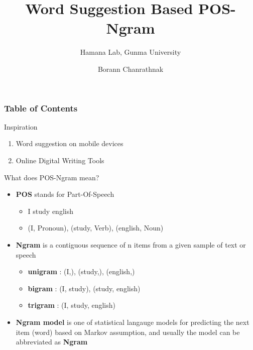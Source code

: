 \documentclass{beamer}
\title{Word Suggestion Based POS-Ngram}
\subtitle{Hamana Lab, Gunma University}
\author{Borann Chanrathnak}
\begin{document}
\maketitle


\begin{frame}
\frametitle{Table of Contents}
\tableofcontents
\end{frame}

\begin{frame}{Inspiration}
\begin{enumerate}
    \item Word suggestion on mobile devices
    \item Online Digital Writing Tools
\end{enumerate}

\end{frame}


\begin{frame}{What does POS-Ngram mean?}
\begin{itemize}
    \item \textbf{POS} stands for Part-Of-Speech
        \begin{itemize}
            \item I study english
            \item (I, Pronoun), (study, Verb), (english, Noun)
        \end{itemize}
    \item \textbf{Ngram} is a contiguous sequence of n items from a given sample of text or speech
        \begin{itemize}
            \item \textbf{unigram} : (I,), (study,), (english,)
            \item \textbf{bigram} : (I, study), (study, english) 
            \item \textbf{trigram} : (I, study, english)
        \end{itemize}
    \item \textbf{Ngram model} is one of statistical langauge models for predicting the next item (word) based on Markov assumption, and usually the model can be abbreviated as \textbf{Ngram}
\end{itemize}
\end{frame}
\end{document}
